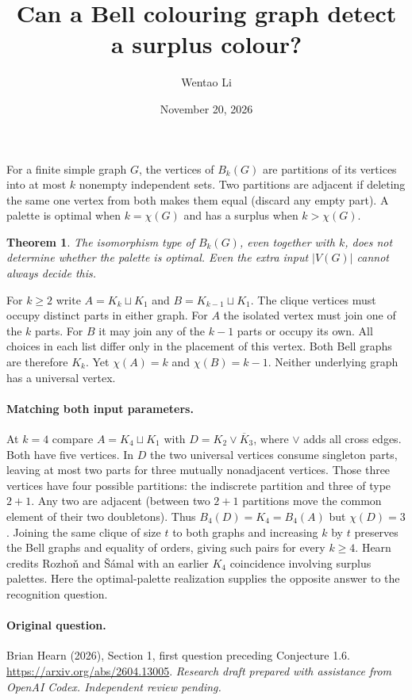 \documentclass[11pt]{article}
\title{Can a Bell colouring graph detect a surplus colour?}
\author{Wentao Li}
\date{November 20, 2026}
\newtheorem{theorem}{Theorem}
\begin{document}
\maketitle
For a finite simple graph $G$, the vertices of $B_k(G)$ are partitions of its vertices into at most $k$ nonempty independent sets. Two partitions are adjacent if deleting the same one vertex from both makes them equal (discard any empty part). A palette is optimal when $k=\chi(G)$ and has a surplus when $k>\chi(G)$.
\begin{theorem}The isomorphism type of $B_k(G)$, even together with $k$, does not determine whether the palette is optimal. Even the extra input $|V(G)|$ cannot always decide this.\end{theorem}
For $k\ge2$ write $A=K_k\sqcup K_1$ and $B=K_{k-1}\sqcup K_1$. The clique vertices must occupy distinct parts in either graph. For $A$ the isolated vertex must join one of the $k$ parts. For $B$ it may join any of the $k-1$ parts or occupy its own. All choices in each list differ only in the placement of this vertex. Both Bell graphs are therefore $K_k$. Yet $\chi(A)=k$ and $\chi(B)=k-1$. Neither underlying graph has a universal vertex.
\paragraph{Matching both input parameters.} At $k=4$ compare $A=K_4\sqcup K_1$ with $D=K_2\vee\overline K_3$, where $\vee$ adds all cross edges. Both have five vertices. In $D$ the two universal vertices consume singleton parts, leaving at most two parts for three mutually nonadjacent vertices. Those three vertices have four possible partitions: the indiscrete partition and three of type $2+1$. Any two are adjacent (between two $2+1$ partitions move the common element of their two doubletons). Thus $B_4(D)=K_4=B_4(A)$ but $\chi(D)=3$. Joining the same clique of size $t$ to both graphs and increasing $k$ by $t$ preserves the Bell graphs and equality of orders, giving such pairs for every $k\ge4$. Hearn credits Rozhoň and Šámal with an earlier $K_4$ coincidence involving surplus palettes. Here the optimal-palette realization supplies the opposite answer to the recognition question.

\paragraph{Original question.} Brian Hearn (2026), Section 1, first question preceding Conjecture 1.6. \url{https://arxiv.org/abs/2604.13005}.
\medskip\noindent\textit{Research draft prepared with assistance from OpenAI Codex. Independent review pending.}
\end{document}
